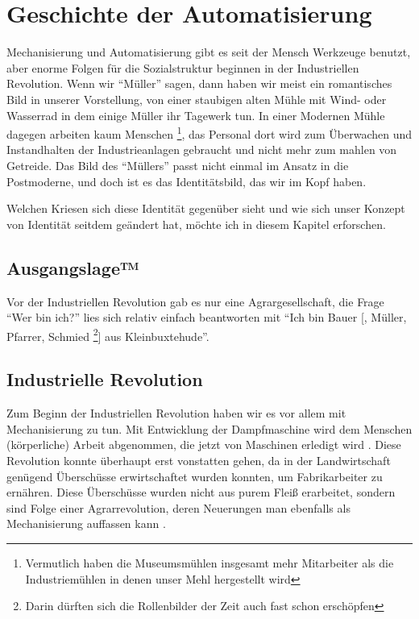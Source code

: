 \section{Geschichte der Automatisierung}

Mechanisierung und Automatisierung gibt es seit der Mensch Werkzeuge benutzt, aber enorme Folgen für die Sozialstruktur beginnen in der Industriellen Revolution.
Wenn wir \enquote{Müller} sagen, dann haben wir meist ein romantisches Bild in unserer Vorstellung, von einer staubigen alten Mühle mit Wind- oder Wasserrad in dem einige Müller ihr Tagewerk tun.
In einer Modernen Mühle dagegen arbeiten kaum Menschen \footnote{Vermutlich haben die Museumsmühlen insgesamt mehr Mitarbeiter als die Industriemühlen in denen unser Mehl hergestellt wird}, das Personal dort wird zum Überwachen und Instandhalten der Industrieanlagen gebraucht und nicht mehr zum mahlen von Getreide.
Das Bild des \enquote{Müllers} passt nicht einmal im Ansatz in die Postmoderne, und doch ist es das Identitätsbild, das wir im Kopf haben.

Welchen Kriesen sich diese Identität gegenüber sieht und wie sich unser Konzept von Identität seitdem geändert hat, möchte ich in diesem Kapitel erforschen.


\subsection{Ausgangslage™}

Vor der Industriellen Revolution gab es nur eine Agrargesellschaft, die Frage \enquote{Wer bin ich?} lies sich relativ einfach beantworten mit \enquote{Ich bin Bauer [, Müller, Pfarrer, Schmied \footnote{Darin dürften sich die Rollenbilder der Zeit auch fast schon erschöpfen}] aus Kleinbuxtehude}.


\subsection{Industrielle Revolution}

Zum Beginn der Industriellen Revolution haben wir es vor allem mit Mechanisierung zu tun.
Mit Entwicklung der Dampfmaschine wird dem Menschen (körperliche) Arbeit abgenommen, die jetzt von Maschinen erledigt wird \parencite{landes}.
Diese Revolution konnte überhaupt erst vonstatten gehen, da in der Landwirtschaft genügend Überschüsse erwirtschaftet wurden konnten, um Fabrikarbeiter zu ernähren. Diese Überschüsse wurden nicht aus purem Fleiß erarbeitet, sondern sind Folge einer Agrarrevolution, deren Neuerungen man ebenfalls als Mechanisierung auffassen kann \parencite{weissenborn, prass}.

